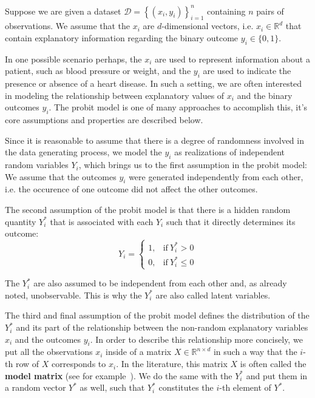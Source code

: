 Suppose we are given a dataset
$\mathcal{D} = \left\{ (x_i, y_i) \right\}_{i=1}^n$
containing $n$ pairs of observations.
We assume that the $x_i$ are $d$-dimensional vectors, i.e.
$x_i \in \mathbb{R}^d$ that contain explanatory information regarding
the binary outcome $y_i \in \{ 0,  1 \}$.

In one possible scenario perhaps, the $x_i$ are used to represent information
about a patient, such as blood pressure or weight, and the $y_i$ are used to indicate
the presence or absence of a heart disease.
In such a setting, we are often interested in modeling the relationship
between explanatory values of $x_i$ and the binary outcomes $y_i$.
The probit model is one of many approaches to accomplish this, it's
core assumptions and properties are described below.

Since it is reasonable to assume that there is a degree of randomness
involved in the data generating process, we model the $y_i$ as realizations
of independent random variables $Y_i$,
which brings us to the first assumption in the probit model:
We assume that the outcomes $y_i$ were generated independently
from each other, i.e. the occurence of one outcome did not affect
the other outcomes.

The second assumption of the probit model is that there is
a hidden random quantity
$Y_i^\ast$ that is associated with each $Y_i$ such that it
directly determines its outcome:
\begin{equation}
    Y_i =
    \begin{cases}
        1, & \text{if}\ Y_i^\ast > 0    \\
        0, & \text{if}\ Y_i^\ast \leq 0
    \end{cases}
\end{equation}

\noindent The $Y_i^\ast$ are also assumed to be independent from each
other and, as already noted, unobservable.
This is why the $Y_i^\ast$ are also called latent variables.

The third and final assumption of the probit model defines the
distribution of the $Y_i^\ast$ and its part of the relationship
between the non-random explanatory variables $x_i$ and the outcomes $y_i$.
In order to describe this relationship more concisely,
we put all the observations $x_i$ inside of a
matrix $X \in \mathbb{R}^{n \times d}$ in such a way that
the $i$-th row of $X$ corresponds to $x_i$.
In the literature, this matrix $X$ is often called the \textbf{model matrix}
(see for example~\cite{glm-agresti}).
We do the same with the $Y_i^\ast$ and put them in a
random vector $Y^\ast$ as well, such that $Y_i^\ast$ constitutes
the $i$-th element of $Y^\ast$.

